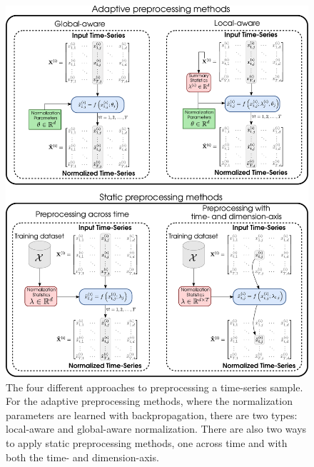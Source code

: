 \documentclass{statsmsc}
\begin{document}
{\begin{figure}
\begin{center}
        \includegraphics[width=\textwidth]{diagrams/local-vs-global-diagram.pdf}
    \end{center}
    \caption{The four different approaches to preprocessing a time-series sample. For the adaptive
        preprocessing methods, where the normalization parameters are learned with backpropagation, there
        are two types: local-aware and global-aware normalization. There are also two ways to apply
    static preprocessing methods, one across time and with both the time- and dimension-axis.}
    \label{fig:local_vs_global}
\end{figure}

}
\end{document}

